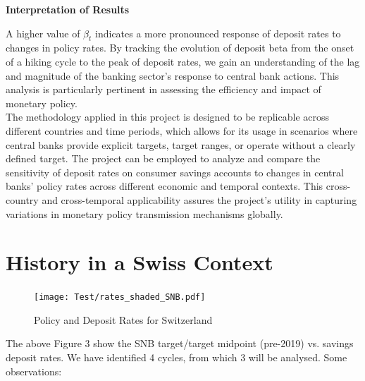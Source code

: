 \documentclass{article}
\begin{document}
\textbf{Interpretation of Results}

A higher value of \( \beta_t \) indicates a more pronounced response of deposit rates to changes in policy rates. By tracking the evolution of deposit beta from the onset of a hiking cycle to the peak of deposit rates, we gain an understanding of the lag and magnitude of the banking sector's response to central bank actions. This analysis is particularly pertinent in assessing the efficiency and impact of monetary policy.\\

The methodology applied in this project is designed to be replicable across different countries and time periods, which allows for its usage in scenarios where central banks provide explicit targets, target ranges, or operate without a clearly defined target. The project can be employed to analyze and compare the sensitivity of deposit rates on consumer savings accounts to changes in central banks’ policy rates across different economic and temporal contexts. This cross-country and cross-temporal applicability assures the project's utility in capturing variations in monetary policy transmission mechanisms globally.\\

\section{History in a Swiss Context}

\begin{figure}[h]
    \centering
    \texttt{[image: Test/rates\_shaded\_SNB.pdf]}
    \caption{Policy and Deposit Rates for Switzerland}
    \label{fig:rates_shaded}
\end{figure}

The above Figure 3 show the SNB target/target midpoint (pre-2019) vs. savings deposit rates. We have identified 4 cycles, from which 3 will be analysed. Some observations:
\end{document}
